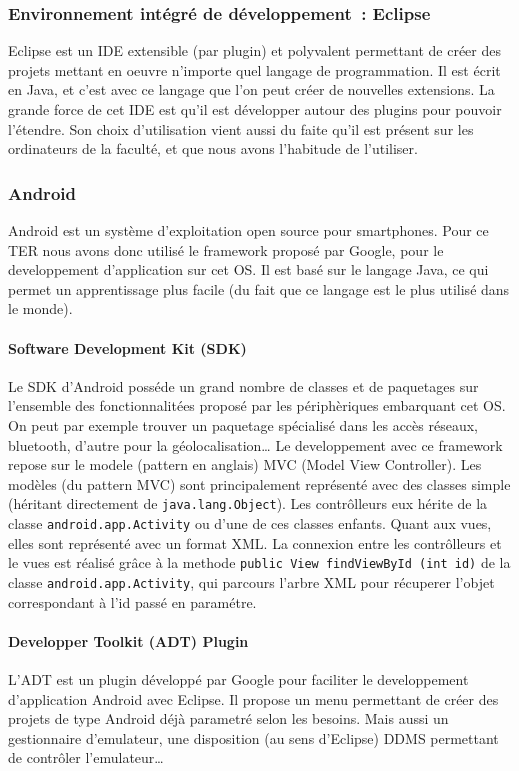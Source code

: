\documentclass[a4paper,11pt,french]{article}
\def\android{Android\texttrademark{}}
\begin{document}
\subsubsection{Environnement intégré de développement~: Eclipse}
Eclipse est un IDE extensible (par plugin) et polyvalent permettant de créer des projets mettant en oeuvre n'importe quel langage de programmation. Il est écrit en Java, et c'est avec ce langage que l'on peut créer de nouvelles extensions. La grande force de cet IDE est qu'il est développer autour des plugins pour pouvoir l'étendre.
Son choix d'utilisation vient aussi du faite qu'il est présent sur les ordinateurs de la faculté, et que nous avons l'habitude de l'utiliser.

\subsubsection{\android{}}
\android{} est un système d'exploitation open source pour smartphones. Pour ce TER nous avons donc utilisé le framework proposé par Google, pour le developpement d'application sur cet OS. Il est basé sur le langage Java, ce qui permet un apprentissage plus facile (du fait que ce langage est le plus utilisé dans le monde).

\paragraph{Software Development Kit (SDK)}
Le SDK d'\android{} posséde un grand nombre de classes et de paquetages sur l'ensemble des fonctionnalitées proposé par les périphèriques embarquant cet OS. On peut par exemple trouver un paquetage spécialisé dans les accès réseaux, bluetooth, d'autre pour la géolocalisation\dots{} Le developpement avec ce framework repose sur le modele (pattern en anglais) MVC (Model View Controller). Les modèles (du pattern MVC) sont principalement représenté avec des classes simple (héritant directement de \verb!java.lang.Object!). Les contrôlleurs eux hérite de la classe \verb!android.app.Activity! ou d'une de ces classes enfants. Quant aux vues, elles sont représenté avec un format XML.
La connexion entre les contrôlleurs et le vues est réalisé grâce à la methode \verb!public View findViewById (int id)! de la classe \verb!android.app.Activity!, qui parcours l'arbre XML pour récuperer l'objet correspondant à l'id passé en paramétre.

\paragraph{Developper Toolkit (ADT) Plugin}
L'ADT est un plugin développé par Google pour faciliter le developpement d'application \android{} avec Eclipse. Il propose un menu permettant de créer des projets de type \android{} déjà parametré selon les besoins. Mais aussi un gestionnaire d'emulateur, une disposition (au sens d'Eclipse) DDMS permettant de contrôler l'emulateur\dots{}
\end{document}
